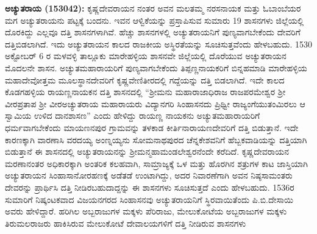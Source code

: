 \textbf{ ಅಚ್ಯುತರಾಯ (153042):} ಕೃಷ್ಣದೇವರಾಯನ ನಂತರ ಅವನ ಮಲತಮ್ಮ ನರಸನಾಯಕ ಮತ್ತು ಓಬಾಂಬೆಯರ ಮಗ ಅಚ್ಯುತರಾಯನು ಪಟ್ಟಕ್ಕೆ ಬಂದನು. ಇವನ ಆಳ್ವಿಕೆಯನ್ನು ಪ್ರಸ್ತಾಪಿಸುವ ಸುಮಾರು 19 ಶಾಸನಗಳು ಜಿಲ್ಲೆಯಲ್ಲಿ ದೊರಕಿದ್ದು ಎಲ್ಲವೂ ದತ್ತಿ ಶಾಸನಗಳಾಗಿವೆ. ಹೆಚ್ಚು ಶಾಸನಗಳಲ್ಲಿ ಅಚ್ಯುತರಾಯನಿಗೆ ಪುಣ್ಯವಾಗಬೇಕೆಂದು ದೇವರಿಗೆ ದತ್ತಿಬಿಡಲಾಗಿದೆ. ಇದು ಅಚ್ಯುತರಾಯನ ಕಾಲದ ರಾಜಕೀಯ ಅಸ್ಥಿರತೆಯನ್ನು ಸೂಚಿಸುತ್ತವೆಂದು ಹೇಳಬಹುದು. 1530 ಅಕ್ಟೋಬರ್​ 6 ರ ಮಳವಳ್ಳಿ ತಾಲ್ಲೂಕು ಮಾರೇಹಳ್ಳಿಯ ಶಾಸನವೇ ಜಿಲ್ಲೆಯಲ್ಲಿ ದೊರೆಯುವ ಅಚ್ಯುತರಾಯನ ಮೊದಲನೇ ಶಾಸನ. ಅಚ್ಯುತಮಹಾರಾಯರಿಗೆ ಪುಣ್ಯವಾಗಬೇಕೆಂದು ತಿಪ್ಪಣ್ಣನಾಯಕರಿಗೆ ಬಿನ್ನಹಮಾಡಿ ಮಾರೇಹಳ್ಳಿಯ ಮಹಾದೇವೋತ್ತಮ ಮೂಲಸ್ಥಾನದೇವರಿಗೆ ಕೃಷ್ಣವೇಣಿತೀರದಲ್ಲಿ ಗದ್ದೆಯನ್ನು ದತ್ತಿ ಬಿಡಲಾಗಿದೆ. ಇದೇ ಕಾಲದ ಕೊಡಗಹಳ್ಳಿಯ ರಾಯಣ್ಣನಾಯಕನ ದತ್ತಿ ಶಾಸನದಲ್ಲಿ “ಶ‍್ರೀಮನು ಮಹಾರಾಜಾಧಿರಾಜ ರಾಜಪರಮೇಶ್ವರ ಶ‍್ರೀ ವೀರಪ್ರತಾಪ ಶ‍್ರೀ ವೀರಅಚ್ಯುತರಾಯ ಮಹಾರಾಯರು ವಿದ್ಯಾನಗರಿ ಸಿಂಹಾಸನದು ಪ್ರಿಥ್ವೀ ರಾಜ್ಯಂಗೆಯುತಂಮಿರಲು ಆ ಸ್ವಾಮಿಯ ಉಳಿದ ದಾನಶಾಸಣ” ಎಂದು ಹೇಳಿದ್ದು ರಾಯಣ್ಣ ನಾಯಕನು ಅಚ್ಯುತಮಹಾರಾಯರಿಗೆ ಧರ್ಮವಾಗಬೇಕೆಂದು ಮಾಯಣನಪುರ ಗ್ರಾಮವನ್ನು ತಳಕಾಡ ಕೀರ್ತಿನಾರಾಯಣದೇವರಿಗೆ ದತ್ತಿ ಬಿಡುತ್ತಾನೆ. ಇದೇ ಕಾರಣಕ್ಕಾಗಿ ವಾರಣಾಸಿ ವರದಯ್ಯ ಅಂಣ್ನಯ್ಯನು ಸೋಮನಾಥಪುರದ ಚೆನ್ನಕೇಶವನಿಗೆ ಹೆಬ್ಬಕವಾಡಿಯನ್ನು ದತ್ತಿಯಾಗಿ ಬಿಡುತ್ತಾನೆ ಈ ಶಾಸನದಲ್ಲಿ ಅಚ್ಯುತರಾಯನನ್ನು ಶ‍್ರೀಮನ್ಮಹಾಮಂಡಲೇಶ್ವರನೆಂದೇ ಕರೆದಿದೆ. ಕೃಷ್ಣದೇವರಾಯನ ಮರಣಾನಂತರ ಅಧಿಕಾರಕ್ಕಾಗಿ ಅಂತರಿಕ ಕಲಹವಾಗಿ, ಸಾಮ್ರಾಜ್ಯಕ್ಕೆ ಒಳ ಮತ್ತು ಹೊರಗಿನ ಶತ್ರುಗಳ ಕಾಟ ಜಾಸ್ತಿಯಾಗಿ ಅಚ್ಯುತರಾಯನ ಸಿಂಹಾಸಾನೋರಹಣಕ್ಕೆ ಅಡೆತಡೆ ಉಂಟಾಗಿದ್ದು, ಅದರ ನಿವಾರಣೆಗಾಗಿ ಅವನ ನಿಷ್ಠಸಾಮಂತರು ದೇವರನ್ನು ಪ್ರಾರ್ಥಿಸಿ ದತ್ತಿ ನೀಡಿರಬಹುದಾದ್ದನ್ನು ಈ ಶಾಸನಗಳು ಸೂಚಿಸುತ್ತದೆ ಎಂದು ಹೇಳಬಹುದು. 1536ರ ಸುಮಾರಿಗೆ ನಿಷ್ಕಂಟಕವಾದ ವಿಜಯನಗರದ ಸಿಂಹಾಸನವು ಅಚ್ಯುತರಾಯನಿಗೆ ಸ್ಥಿರವಾಯಿತೆಂದು ಪಿ.ಬಿ.ದೇಸಾಯಿ ಅವರು ಹೇಳಿದ್ದಾರೆ. ಹರಿಗಿಲ ಅಬ್ಬರಾಜುಗಳ ಮಕ್ಕಳು ಪೆರಿರಾಜು, ಮೇಲುಕೋಟೆಯ ಅಬ್ಬರಾಜುಗಳ ಮಕ್ಕಳು ತಿರುಮಲರಾಜರು ಹಾಕಿಸಿರುವ ಮೇಲುಕೋಟೆ ದೇವಾಲಯಗಳಿಗೆ ದತ್ತಿ ನೀಡಿರುವ ಶಾಸನಗಳು
